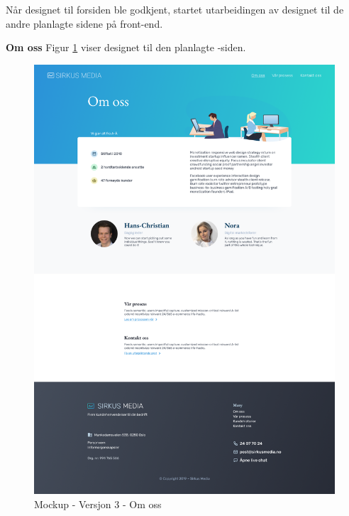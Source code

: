 Når designet til forsiden ble godkjent, startet utarbeidingen av designet til de andre planlagte sidene på front-end.

\textbf{Om oss}
Figur \ref{fig:mockup-v3-about} viser designet til den planlagte -siden.
\begin{figure}[H]
    \centering
    \includegraphics[height=.9\textheight]{mockup3-about.png}
    \caption{Mockup - Versjon 3 - Om oss}
    \label{fig:mockup-v3-about}
\end{figure}

